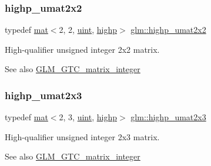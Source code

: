 \subsubsection{\texorpdfstring{highp\+\_\+umat2x2}{highp\_umat2x2}}
{\footnotesize\ttfamily typedef \hyperlink{structglm_1_1mat}{mat}$<$2, 2, \hyperlink{group__core__precision_ga4fd29415871152bfb5abd588334147c8}{uint}, \hyperlink{namespaceglm_a36ed105b07c7746804d7fdc7cc90ff25ac6f7eab42eacbb10d59a58e95e362074}{highp}$>$ \hyperlink{group__gtc__matrix__integer_ga21045c3ef9df4966779713fa1a7b4b52}{glm\+::highp\+\_\+umat2x2}}

High-\/qualifier unsigned integer 2x2 matrix. \begin{DoxySeeAlso}{See also}
\hyperlink{group__gtc__matrix__integer}{G\+L\+M\+\_\+\+G\+T\+C\+\_\+matrix\+\_\+integer} 
\end{DoxySeeAlso}
\mbox{\label{group__gtc__matrix__integer_ga0264db97a9144fa08315b5a4f455872f}} 
\subsubsection{\texorpdfstring{highp\+\_\+umat2x3}{highp\_umat2x3}}
{\footnotesize\ttfamily typedef \hyperlink{structglm_1_1mat}{mat}$<$2, 3, \hyperlink{group__core__precision_ga4fd29415871152bfb5abd588334147c8}{uint}, \hyperlink{namespaceglm_a36ed105b07c7746804d7fdc7cc90ff25ac6f7eab42eacbb10d59a58e95e362074}{highp}$>$ \hyperlink{group__gtc__matrix__integer_ga0264db97a9144fa08315b5a4f455872f}{glm\+::highp\+\_\+umat2x3}}

High-\/qualifier unsigned integer 2x3 matrix. \begin{DoxySeeAlso}{See also}
\hyperlink{group__gtc__matrix__integer}{G\+L\+M\+\_\+\+G\+T\+C\+\_\+matrix\+\_\+integer} 
\end{DoxySeeAlso}
\mbox{\label{group__gtc__matrix__integer_ga451e726ea1f020c97b2f8aa41242055b}} 
